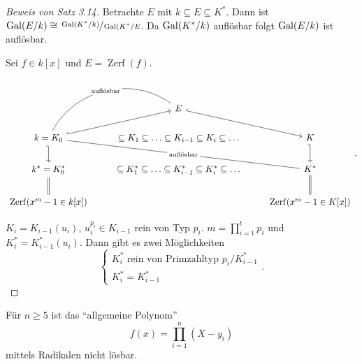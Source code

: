 \begin{proof}[Beweis von Satz 3.14]
	Betrachte $E$ mit $k \subseteq E \subseteq K^{*}$. Dann ist $\operatorname{Gal}(E / k) \cong \sfrac{\operatorname{Gal}(K^{*} / k)}{\operatorname{Gal}(K^{*} / E}$.
	Da $\operatorname{Gal}(K^{*} / k)$ auflösbar folgt $\operatorname{Gal}(E / k)$ ist auflösbar.

	Sei $f \in k[x]$ und $E = \operatorname{Zerf}(f)$.
	\[
	\begin{tikzcd}
	& E \arrow[rd, hook]             &                    \\
	k= K_0 \arrow[ru, hook] \arrow[d, hook'] \arrow[rrd, "\text{auflösbar}" description, no head] \arrow[ru, "\text{auflösbar}" description, no head, bend left=49] 
	& \subseteq K_1 \subseteq \ldots \subseteq K_{i-1} \subseteq K_{i} \subseteq \ldots & K \arrow[d, hook'] \\
	k^{*} = K_0^* \arrow[d,equal] & \subseteq K_1^{*} \subseteq \ldots \subseteq K_{i-1}^{*} \subseteq K_{i}^{*} \subseteq \ldots & K^* \arrow[d,equal] \\
	\operatorname{Zerf}(x^{m}-1 \in k[x]) & & \operatorname{Zerf}(x^{m}-1 \in K[x])
\end{tikzcd}
	.\] 

	$K_{i} = K_{i-1}(u_{i})$, $u_{i}^{p_{i}} \in K_{i-1}$ rein von Typ $p_{i}$. $m =  \prod_{i=1}^{t} p_{i}$ 
	und $K_{i}^{*} = K_{i-1}^{*}(u_{i})$. Dann gibt es zwei Möglichkeiten
	\[
	\begin{cases}
		K_{i}^{*} \text{ rein von Primzahltyp } p_{i} / K_{i-1}^{*}\\
		K_{i}^{*} = K_{i-1}^{*}
	\end{cases}
	.\] 
\end{proof}

\begin{corollary}
	Für $n \geq 5$ ist das \enquote{allgemeine Polynom}
	\[
		f(x) = \prod_{i=1}^{n} (X-y_{i})
	\] 
	mittels Radikalen nicht lösbar.
\end{corollary}

